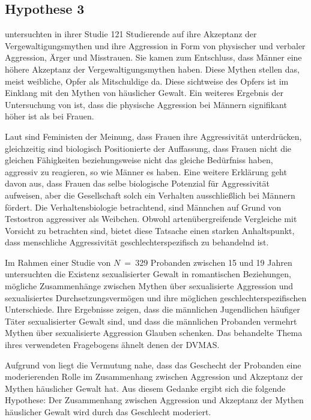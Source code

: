 \subsection{Hypothese 3}    \label{subsec_2.2.3}
\textcite{H2_u_3_Bhogal_2016} untersuchten in ihrer Studie 121 Studierende auf ihre Akzeptanz der Vergewaltigungsmythen und ihre Aggression in Form von physischer und verbaler Aggression, Ärger und Misstrauen. Sie kamen zum Entschluss, dass Männer eine höhere Akzeptanz der Vergewaltigungsmythen haben. Diese Mythen stellen das, meist weibliche, Opfer als Mitschuldige da. Diese sichtweise des Opfers ist im Einklang mit den Mythen von häuslicher Gewalt. Ein weiteres Ergebnis der Untersuchung von \textcite{H2_u_3_Bhogal_2016} ist, dass die physische Aggression bei Männern signifikant höher ist als bei Frauen.

Laut \textcite{H3_MFUnterschied} sind Feministen der Meinung, dass Frauen ihre Aggressivität unterdrücken, gleichzeitig sind biologisch Positionierte der Auffassung, dass Frauen nicht die gleichen Fähigkeiten beziehungsweise nicht das gleiche Bedürfniss haben, aggressiv zu reagieren, so wie Männer es haben. Eine weitere Erklärung geht davon aus, dass Frauen das selbe biologische Potenzial für Aggressivität aufweisen, aber die Gesellschaft solch ein Verhalten ausschließlich bei Männern fördert. Die Verhaltensbiologie betrachtend, sind Männchen auf Grund von Testostron aggressiver als Weibchen. Obwohl artenübergreifende Vergleiche mit Vorsicht zu betrachten sind, bietet diese Tatsache einen starken Anhaltspunkt, dass menschliche Aggressivität geschlechterspezifisch zu behandelnd ist.

Im Rahmen einer Studie von $N$~=~329 Probanden zwischen 15 und 19 Jahren untersuchten \textcite{H3_2020} die Existenz sexualisierter Gewalt in romantischen Beziehungen, mögliche Zusammenhänge zwischen Mythen über sexualisierte Aggression und sexualisiertes Durchsetzungsvermögen und ihre möglichen geschlechterspezifischen Unterschiede. Ihre Ergebnisse zeigen, dass die männlichen Jugendlichen häufiger Täter sexualisierter Gewalt sind, und dass die männlichen Probanden vermehrt Mythen über sexualisierte Aggression Glauben schenken. Das behandelte Thema ihres verwendeten Fragebogens ähnelt denen der DVMAS.

Aufgrund von \textcite{H2_u_3_Bhogal_2016, H3_MFUnterschied, H3_2020} liegt die Vermutung nahe, dass das Geschecht der Probanden eine moderierenden Rolle im Zusammenhang zwischen Aggression und Akzeptanz der Mythen häuslicher Gewalt hat. Aus diesem Gedanke ergibt sich die folgende Hypothese: Der Zusammenhang zwischen Aggression und Akzeptanz der Mythen häuslicher Gewalt wird durch das Geschlecht moderiert.

